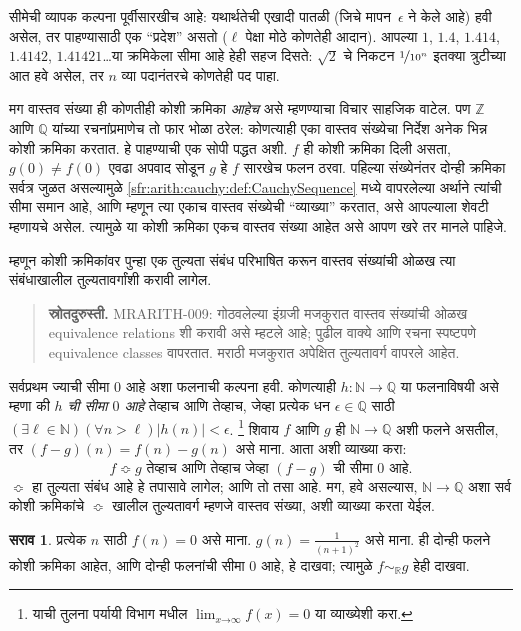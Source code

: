 \documentclass[11pt,a4paper,openany]{book}
\theoremstyle{definition}
\newtheorem{prob}{सराव}[chapter]
\newcommand{\Nat}{\mathbb{N}}
\newcommand{\Int}{\mathbb{Z}}
\newcommand{\Rat}{\mathbb{Q}}
\newcommand{\Real}{\mathbb{R}}
\newcommand{\Realequiv}{\Bumpeq}
\begin{document}
सीमेची व्यापक कल्पना पूर्वीसारखीच आहे: यथार्थतेची एखादी पातळी
(जिचे मापन~$\epsilon$ ने केले आहे) हवी असेल, तर पाहण्यासाठी एक
“प्रदेश” असतो ($\ell$ पेक्षा मोठे कोणतेही आदान). आपल्या $1$, $1.4$,
$1.414$, $1.4142$, $1.41421$\ldots या क्रमिकेला सीमा आहे हेही सहज
दिसते: $\sqrt{2}$ चे निकटन $\nicefrac{1}{10^{n}}$ इतक्या त्रुटीच्या
आत हवे असेल, तर $n$ व्या पदानंतरचे कोणतेही पद पाहा.

मग वास्तव संख्या ही कोणतीही कोशी क्रमिका \emph{आहेच} असे म्हणण्याचा
विचार साहजिक वाटेल. पण $\Int$ आणि $\Rat$ यांच्या रचनांप्रमाणेच तो फार
भोळा ठरेल: कोणत्याही एका वास्तव संख्येचा निर्देश अनेक भिन्न कोशी क्रमिका
करतात. हे पाहण्याची एक सोपी पद्धत अशी. $f$ ही कोशी क्रमिका दिली असता,
$g(0)\neq f(0)$ एवढा अपवाद सोडून $g$ हे $f$ सारखेच फलन ठरवा. पहिल्या
संख्येनंतर दोन्ही क्रमिका सर्वत्र जुळत असल्यामुळे
\ref{sfr:arith:cauchy:def:CauchySequence} मध्ये वापरलेल्या अर्थाने त्यांची सीमा समान
आहे, आणि म्हणून त्या एकाच वास्तव संख्येची “व्याख्या” करतात, असे
आपल्याला शेवटी म्हणायचे असेल. त्यामुळे या कोशी क्रमिका एकच वास्तव
संख्या आहेत असे आपण खरे तर मानले पाहिजे.

म्हणून कोशी क्रमिकांवर पुन्हा एक तुल्यता संबंध परिभाषित करून वास्तव
संख्यांची ओळख त्या संबंधाखालील तुल्यतावर्गांशी करावी लागेल.
\begin{quote}\small\textbf{स्रोतदुरुस्ती.} MRARITH-009: गोठवलेल्या इंग्रजी मजकुरात वास्तव संख्यांची ओळख equivalence relations शी करावी असे म्हटले आहे; पुढील वाक्ये आणि रचना स्पष्टपणे equivalence classes वापरतात. मराठी मजकुरात अपेक्षित तुल्यतावर्ग वापरले आहेत.\end{quote}
सर्वप्रथम ज्याची सीमा $0$ आहे अशा फलनाची कल्पना हवी. कोणत्याही $h :
\Nat \to \Rat$ या फलनाविषयी असे म्हणा की \emph{$h$ ची सीमा $0$ आहे}
तेव्हाच आणि तेव्हाच, जेव्हा प्रत्येक धन $\epsilon \in \Rat$ साठी
$(\exists \ell \in \Nat)(\forall n > \ell)|h(n)| < \epsilon$.
\footnote{याची तुलना पर्यायी विभाग मधील $\lim_{x
\mathord{\rightarrow}\infty}f(x) = 0$ या व्याख्येशी करा.}
शिवाय $f$ आणि $g$ ही $\Nat \to \Rat$ अशी फलने असतील, तर
$(f-g)(n) = f(n) - g(n)$ असे माना. आता अशी व्याख्या करा:
\[
	f \Realequiv g \text{ तेव्हाच आणि तेव्हाच जेव्हा $(f-g)$ ची सीमा $0$ आहे}.
\]
$\Realequiv$ हा तुल्यता संबंध आहे हे तपासावे लागेल; आणि तो तसा आहे.
मग, हवे असल्यास, $\Nat \to \Rat$ अशा सर्व कोशी क्रमिकांचे
$\Realequiv$ खालील तुल्यतावर्ग म्हणजे वास्तव संख्या, अशी व्याख्या करता
येईल.

\begin{prob}
प्रत्येक $n$ साठी $f(n) = 0$ असे माना. $g(n) =
\frac{1}{(n+1)^2}$ असे माना. ही दोन्ही फलने कोशी क्रमिका आहेत, आणि
दोन्ही फलनांची सीमा $0$ आहे, हे दाखवा; त्यामुळे $f \sim_\Real g$
हेही दाखवा.
\end{prob}
\end{document}
